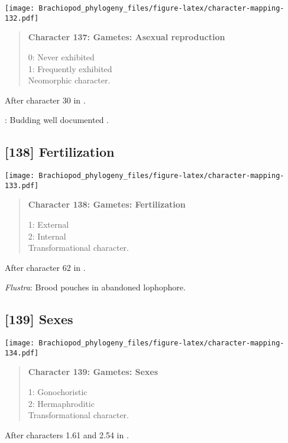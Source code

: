 \documentclass[openany]{book}
\theoremstyle{definition}
\theoremstyle{definition}
\theoremstyle{definition}
\theoremstyle{remark}
\begin{document}
\texttt{[image: Brachiopod\_phylogeny\_files/figure-latex/character-mapping-132.pdf]}

\begin{quote}
\textbf{Character 137: Gametes: Asexual reproduction}

0: Never exhibited\\
1: Frequently exhibited\\
Neomorphic character.
\end{quote}

After character 30 in \citet{Haszprunar1996}.

\hypertarget{TAXLABELS-coding-137}{}
: Budding well documented
\citep[e.g.][]{Zhuravlev2015Ediacaranskeletal}.

\subsection*{{[}138{]} Fertilization}\label{fertilization}

\texttt{[image: Brachiopod\_phylogeny\_files/figure-latex/character-mapping-133.pdf]}

\begin{quote}
\textbf{Character 138: Gametes: Fertilization}

1: External\\
2: Internal\\
Transformational character.
\end{quote}

After character 62 in \citet{Haszprunar2000}.

\hypertarget{Flustra-coding-138}{}
\emph{Flustra}: Brood pouches in abandoned lophophore.

\subsection*{{[}139{]} Sexes}\label{sexes}

\texttt{[image: Brachiopod\_phylogeny\_files/figure-latex/character-mapping-134.pdf]}

\begin{quote}
\textbf{Character 139: Gametes: Sexes}

1: Gonochoristic\\
2: Hermaphroditic\\
Transformational character.
\end{quote}

After characters 1.61 and 2.54 in \citet{SPS1996}.
\end{document}
